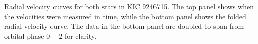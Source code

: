 \label{fig:rvfig} Radial velocity curves for both stars in KIC 9246715. The top panel shows when the velocities were measured in time, while the bottom panel shows the folded radial velocity curve. The data in the bottom panel are doubled to span from orbital phase $0-2$ for clarity.